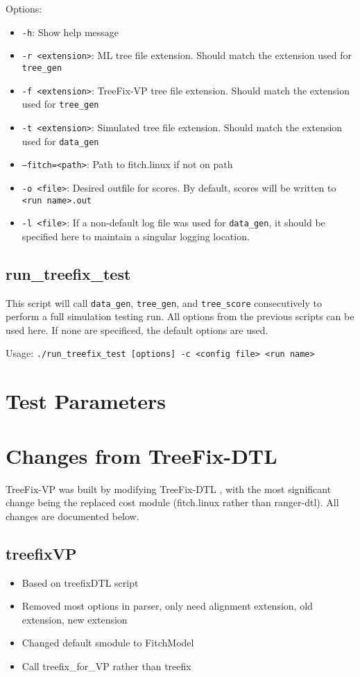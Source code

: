 \documentclass[11pt]{article}
\begin{document}
    Options:
    \begin{itemize}
        \setlength{\itemindent}{5mm}
        \item \texttt{-h}: Show help message
        \item \texttt{-r <extension>}: ML tree file extension. Should match the extension used for \texttt{tree\_gen}
        \item \texttt{-f <extension>}: TreeFix-VP tree file extension. Should match the extension used for \texttt{tree\_gen}
        \item \texttt{-t <extension>}: Simulated tree file extension. Should match the extension used for \texttt{data\_gen}
        \item \texttt{--fitch=<path>}: Path to fitch.linux if not on path
        \item \texttt{-o <file>}: Desired outfile for scores. By default, scores will be written to \texttt{<run name>.out}
        \item \texttt{-l <file>}: If a non-default log file was used for \texttt{data\_gen}, it should be specified here to maintain a singular logging location.
    \end{itemize}

\subsection{run\_treefix\_test}
    This script will call \texttt{data\_gen}, \texttt{tree\_gen}, and \texttt{tree\_score} consecutively to perform a full simulation testing run. All options from the previous scripts can be used here. If none are specificed, the default options are used.
    \vspace{2mm}

    Usage: \texttt{./run\_treefix\_test [options] -c <config file> <run name>}

\section{Test Parameters}

\section{Changes from TreeFix-DTL}
TreeFix-VP was built by modifying TreeFix-DTL \cite{treefix-dtl}, with the most significant change being the replaced cost module (fitch.linux rather than ranger-dtl). All changes are documented below.

\subsection{treefixVP}
\begin{itemize}
    \item Based on treefixDTL script
    \item Removed most options in parser, only need alignment extension, old extension, new extension
    \item Changed default smodule to FitchModel
    \item Call treefix{\_}for{\_}VP rather than treefix
\end{itemize}
\end{document}
